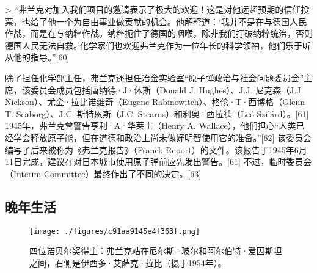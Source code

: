 > “弗兰克对加入我们项目的邀请表示了极大的欢迎！这是对他远超预期的信任投票，也给了他一个为自由事业做贡献的机会。他解释道：‘我并不是在与德国人民作战，而是在与纳粹作战。纳粹扼住了德国的咽喉，除非我们打破纳粹统治，否则德国人民无法自救。’化学家们也欢迎弗兰克作为一位年长的科学领袖，他们乐于听从他的指导。”[60]

除了担任化学部主任，弗兰克还担任冶金实验室“原子弹政治与社会问题委员会”主席，该委员会成员包括唐纳德·J·休斯（Donald J. Hughes）、J.J. 尼克森（J.J. Nickson）、尤金·拉比诺维奇（Eugene Rabinowitch）、格伦·T·西博格（Glenn T. Seaborg）、J.C. 斯特恩斯（J.C. Stearns）和利奥·西拉德（Leó Szilárd）。[61] 1945年，弗兰克曾警告亨利·A·华莱士（Henry A. Wallace），他们担心“人类已经学会释放原子能，但在道德和政治上尚未做好明智使用它的准备。”[62] 该委员会编写了后来被称为《弗兰克报告》（Franck Report）的文件。该报告于1945年6月11日完成，建议在对日本城市使用原子弹前应先发出警告。[61] 不过，临时委员会（Interim Committee）最终作出了不同的决定。[63]
\subsection{晚年生活}
\begin{figure}[ht]
\centering
\texttt{[image: ./figures/c91aa9145e4f363f.png]}
\caption{四位诺贝尔奖得主：弗兰克站在尼尔斯·玻尔和阿尔伯特·爱因斯坦之间，右侧是伊西多·艾萨克·拉比（摄于1954年）。} \label{fig_ZMSflk_3}
\end{figure}
